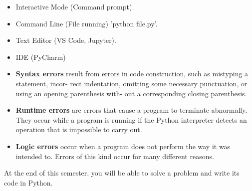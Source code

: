 \begin{frame}
\begin{center}
\end{center}

\end{frame}

  

\begin{frame}

\begin{itemize}
  \item Interactive Mode (Command prompt).\pause
  \item Command Line (File running)  'python file.py'. \pause
  \item Text Editor (VS Code, Jupyter). \pause
  \item IDE (PyCharm)
\end{itemize}
  

\end{frame}
\begin{frame}

  \begin{itemize}
    \item \textbf{Syntax errors} result from errors in code construction, such as mistyping a statement, incor-
rect indentation, omitting some necessary punctuation, or using an opening parenthesis with-
out a corresponding closing parenthesis.
    \item \textbf{Runtime errors} are errors that cause a program to terminate abnormally. They occur while a
    program is running if the Python interpreter detects an operation that is impossible to carry
    out.
    \item \textbf{Logic errors} occur when a program does not perform the way it was intended to. Errors of this
    kind occur for many different reasons.
  \end{itemize}

\end{frame}
\begin{frame}
\begin{block}
  
    At the end of this semester, you will be able to solve a problem and write its code in Python.
  
\end{block}
\end{frame}